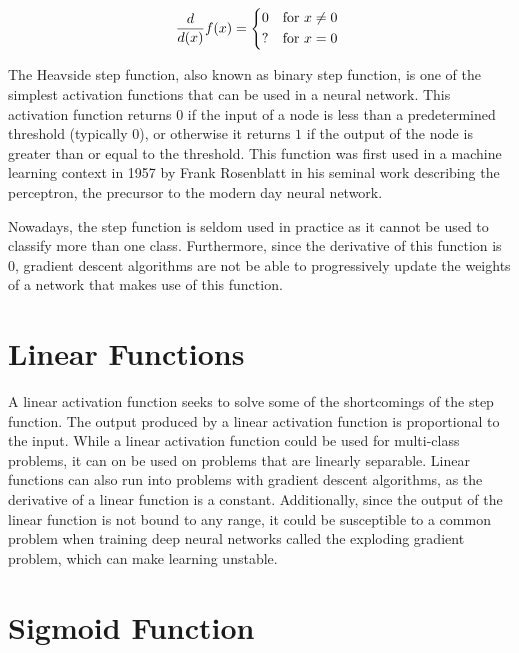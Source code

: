 \begin{equation}\label{stepfunctionderivative}
    \frac{d}{d(x)}f(x) =
      \begin{dcases*}
                                       0 & \text{for \(x \neq 0\)} \\
                                       ? & \text{for \(x = 0\)} \\
      \end{dcases*}
\end{equation}

The Heavside step function, also known as binary step function, is one of the simplest activation functions that can be used in a neural network. This activation function returns $0$ if the input of a node is less than a predetermined threshold (typically $0$), or otherwise it returns $1$ if the output of the node is greater than or equal to the threshold. This function was first used in a machine learning context in 1957 by Frank Rosenblatt in his seminal work describing the perceptron, the precursor to the modern day neural network\cite{rosenblatt1957perceptron}. 

Nowadays, the step function is seldom used in practice as it cannot be used to classify more than one class. Furthermore, since the derivative of this function is $0$, gradient descent algorithms are not be able to progressively update the weights of a network that makes use of this function\cite{Snyman2005}.

\section{Linear Functions}\label{sec:linear-function}

A linear activation function seeks to solve some of the shortcomings of the step function. The output produced by a linear activation function is proportional to the input. While a linear activation function could be used for multi-class problems, it can on be used on problems that are linearly separable. Linear functions can also run into problems with gradient descent algorithms, as the derivative of a linear function is a constant. Additionally, since the output of the linear function is not bound to any range, it could be susceptible to a common problem when training deep neural networks called the exploding gradient problem, which can make learning unstable\cite{goodfellow2016deeplearning}.

\section{Sigmoid Function}\label{sec:sigmoid}


